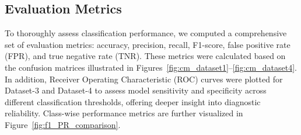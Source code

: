 \documentclass[a4paper,fleqn]{cas-sc}
\begin{document}
\begin{table}[!htbp]  
      \begin{center}
     \caption{Per-class results of CovNet22 on the Dataset-4 test split (909 images, seed 42; calculated from the confusion matrix)} 
     \label{tab:results_dataset4}
    \end{center}
    \end{table}


\subsection{Evaluation Metrics}

To thoroughly assess classification performance, we computed a comprehensive set of evaluation metrics: accuracy, precision, recall, F1-score, false positive rate (FPR), and true negative rate (TNR). These metrics were calculated based on the confusion matrices illustrated in Figures~\ref{fig:cm_dataset1}--\ref{fig:cm_dataset4}. In addition, Receiver Operating Characteristic (ROC) curves were plotted for Dataset-3 and Dataset-4 to assess model sensitivity and specificity across different classification thresholds, offering deeper insight into diagnostic reliability. Class-wise performance metrics are further visualized in Figure~\ref{fig:f1_PR_comparison}.
\end{document}
